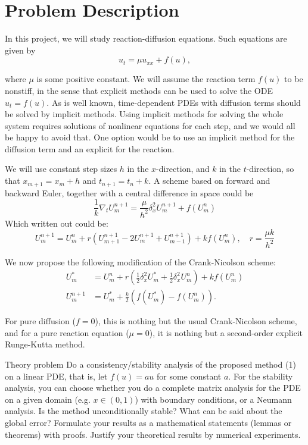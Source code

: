 \section{Problem Description}

In this project, we will study reaction-diffusion equations. Such equations are given by
\begin{equation}
  u_t = \mu u_{xx} + f(u),
\end{equation}

where $\mu$ is some positive constant.
We will assume the reaction term $f(u)$ to be nonstiff, in the sense that explicit methods can be used to solve the ODE $u_t = f(u)$. As is well known, time-dependent PDEs with diffusion terms should be solved by implicit methods. Using implicit methods for solving the whole system requires solutions of nonlinear equations for each step, and we would all be happy to avoid that. One option would be to use an implicit method for the diffusion term and an explicit for the reaction.

We will use constant step sizes $h$ in the $x$-direction, and $k$ in the $t$-direction, so that $x_{m+1} = x_m + h$ and $t_{n+1} = t_n + k$. A scheme based on forward and backward Euler, together with a central difference in space could be
\begin{equation}
  \frac{1}{k} \nabla_t U_m^{n+1}  = \frac{\mu}{h^2} \delta_x^2 U_m^{n+1} + f(U_m^n)
\end{equation}
Which written out could be:
\begin{equation}
  U_m^{n+1}  = U_m^n + r \left( U_{m+1}^{n+1} - 2 U_m^{n+1} + U_{m-1}^{n+1} \right) + k f(U_m^n), \quad r = \frac{\mu k}{h^2}
\end{equation}

We now propose the following modification of the Crank-Nicolson scheme:
\begin{align*}
  U_m^*     & = U_m^n + r \left( \frac{1}{2} \delta_x^2 U_m^* + \frac{1}{2} \delta_x^2 U_m^n \right) + k f(U_m^n) \\
  U_m^{n+1} & = U_m^* + \frac{k}{2} \left( f(U_m^*) - f(U_m^n) \right).
\end{align*}

For pure diffusion ($f = 0$), this is nothing but the usual Crank-Nicolson scheme, and for a pure reaction equation ($\mu = 0$), it is nothing but a second-order explicit Runge-Kutta method.

\begin{railingbox}{Theory problem}
  Do a consistency/stability analysis of the proposed method (1) on a linear PDE, that is, let \(f(u) = au\) for some constant \(a\).
  For the stability analysis, you can choose whether you do a complete matrix analysis for the PDE on a given domain (e.g. \(x \in (0, 1)\)) with boundary conditions, or a Neumann analysis. Is the method unconditionally stable? What can be said about the global error?
  Formulate your results as a mathematical statements (lemmas or theorems) with proofs.
  Justify your theoretical results by numerical experiments.
\end{railingbox}


